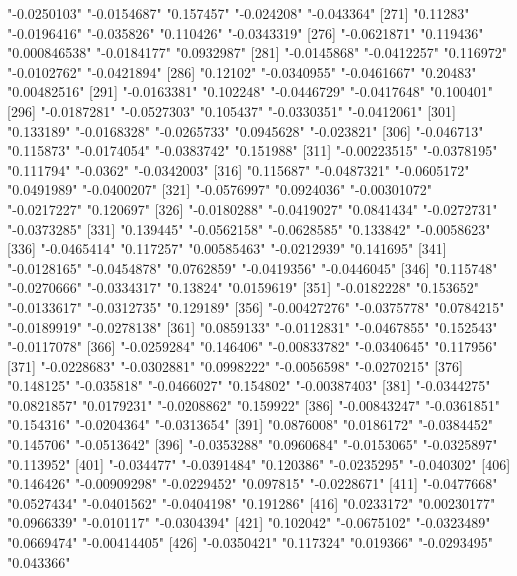 \begin{Schunk}
\begin{Soutput}
[266] "-0.0250103"   "-0.0154687"   "0.157457"     "-0.024208"    "-0.043364"   
[271] "0.11283"      "-0.0196416"   "-0.035826"    "0.110426"     "-0.0343319"  
[276] "-0.0621871"   "0.119436"     "0.000846538"  "-0.0184177"   "0.0932987"   
[281] "-0.0145868"   "-0.0412257"   "0.116972"     "-0.0102762"   "-0.0421894"  
[286] "0.12102"      "-0.0340955"   "-0.0461667"   "0.20483"      "0.00482516"  
[291] "-0.0163381"   "0.102248"     "-0.0446729"   "-0.0417648"   "0.100401"    
[296] "-0.0187281"   "-0.0527303"   "0.105437"     "-0.0330351"   "-0.0412061"  
[301] "0.133189"     "-0.0168328"   "-0.0265733"   "0.0945628"    "-0.023821"   
[306] "-0.046713"    "0.115873"     "-0.0174054"   "-0.0383742"   "0.151988"    
[311] "-0.00223515"  "-0.0378195"   "0.111794"     "-0.0362"      "-0.0342003"  
[316] "0.115687"     "-0.0487321"   "-0.0605172"   "0.0491989"    "-0.0400207"  
[321] "-0.0576997"   "0.0924036"    "-0.00301072"  "-0.0217227"   "0.120697"    
[326] "-0.0180288"   "-0.0419027"   "0.0841434"    "-0.0272731"   "-0.0373285"  
[331] "0.139445"     "-0.0562158"   "-0.0628585"   "0.133842"     "-0.0058623"  
[336] "-0.0465414"   "0.117257"     "0.00585463"   "-0.0212939"   "0.141695"    
[341] "-0.0128165"   "-0.0454878"   "0.0762859"    "-0.0419356"   "-0.0446045"  
[346] "0.115748"     "-0.0270666"   "-0.0334317"   "0.13824"      "0.0159619"   
[351] "-0.0182228"   "0.153652"     "-0.0133617"   "-0.0312735"   "0.129189"    
[356] "-0.00427276"  "-0.0375778"   "0.0784215"    "-0.0189919"   "-0.0278138"  
[361] "0.0859133"    "-0.0112831"   "-0.0467855"   "0.152543"     "-0.0117078"  
[366] "-0.0259284"   "0.146406"     "-0.00833782"  "-0.0340645"   "0.117956"    
[371] "-0.0228683"   "-0.0302881"   "0.0998222"    "-0.0056598"   "-0.0270215"  
[376] "0.148125"     "-0.035818"    "-0.0466027"   "0.154802"     "-0.00387403" 
[381] "-0.0344275"   "0.0821857"    "0.0179231"    "-0.0208862"   "0.159922"    
[386] "-0.00843247"  "-0.0361851"   "0.154316"     "-0.0204364"   "-0.0313654"  
[391] "0.0876008"    "0.0186172"    "-0.0384452"   "0.145706"     "-0.0513642"  
[396] "-0.0353288"   "0.0960684"    "-0.0153065"   "-0.0325897"   "0.113952"    
[401] "-0.034477"    "-0.0391484"   "0.120386"     "-0.0235295"   "-0.040302"   
[406] "0.146426"     "-0.00909298"  "-0.0229452"   "0.097815"     "-0.0228671"  
[411] "-0.0477668"   "0.0527434"    "-0.0401562"   "-0.0404198"   "0.191286"    
[416] "0.0233172"    "0.00230177"   "0.0966339"    "-0.010117"    "-0.0304394"  
[421] "0.102042"     "-0.0675102"   "-0.0323489"   "0.0669474"    "-0.00414405" 
[426] "-0.0350421"   "0.117324"     "0.019366"     "-0.0293495"   "0.043366"    

\end{Soutput}
\end{Schunk}
